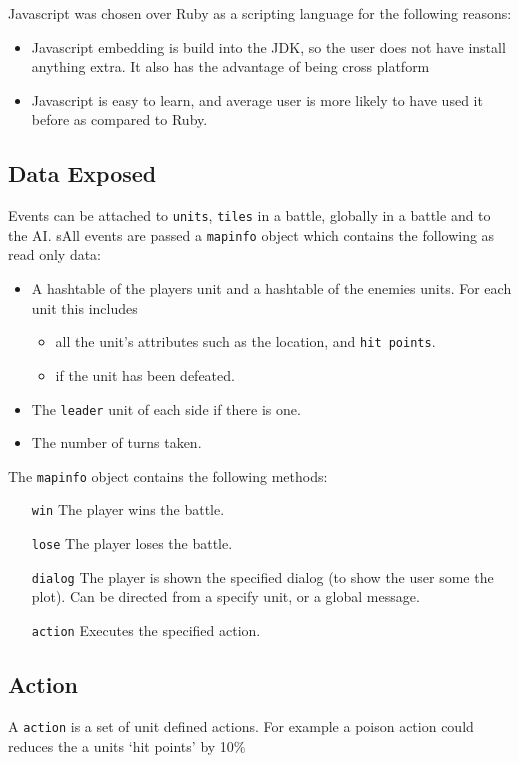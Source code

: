 \noindent Javascript was chosen over Ruby as a scripting language for the following reasons:
\begin{itemize}
	\item Javascript embedding is build into the JDK, so the user does not have install anything extra. It also has the advantage of being cross platform  
	\item Javascript is easy to learn, and average user is more likely to have used it before as compared to Ruby.
\end{itemize}

\subsection{Data Exposed}
	Events can be attached to \texttt{units}, \texttt{tiles} in a battle, globally in a battle and to the AI.
sAll events are passed a \texttt{mapinfo} object which contains the following as read only data:
\begin{itemize}
	\item A hashtable of the players unit and a hashtable of the enemies units. For each unit this includes 
		\begin{itemize}
			\item all the unit's attributes such as the location, and \texttt{hit points}. 
			\item if the unit has been defeated. 
		\end{itemize}
	\item The \texttt{leader} unit of each side if there is one.
	\item The number of turns taken.
\end{itemize}
The \texttt{mapinfo}  object contains the following methods:
\begin{itemize}
	\item[\texttt{win}]     The player wins the battle.
	\item[\texttt{lose}]    The player loses the battle.
	\item[\texttt{dialog}]  The player is shown the specified dialog (to show the user some the plot). Can be directed from a specify unit, or a global message.
	\item[\texttt{action}]   Executes the specified action.
\end{itemize}

\subsection{Action}
A \texttt{action} is a set of unit defined actions. For example a poison action could reduces the a units `hit points' by 10\% 

